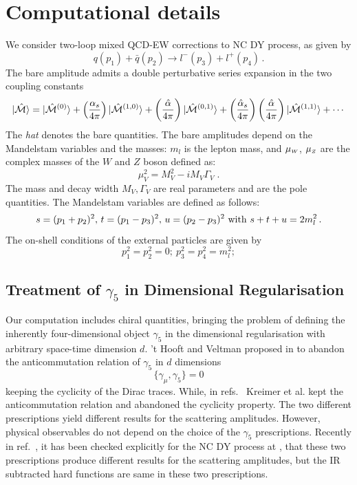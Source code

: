 \documentclass[a4paper]{jpconf}
\begin{document}
\section{Computational details}
\label{sec:comp}
We consider two-loop mixed QCD-EW corrections to NC DY process, as given by
\begin{equation}
 q(p_1) + \bar{q}(p_2) \rightarrow l^{-}(p_3) + l^{+} (p_4) \,.
\label{eq:process}
\end{equation}
% 
The bare amplitude admits a double perturbative series expansion in the two coupling constants
\begin{equation}
 | \unM \rangle = |\unM^{(0)} \rangle + \asr |\unM^{(1,0)} \rangle + \uaem |\unM^{(0,1)} \rangle  + \asrhat \uaem |\unM^{(1,1)} \rangle + \cdots
\end{equation}
% 
The \textit{hat} denotes the bare quantities.
% 
The bare amplitudes depend on the Mandelstam variables and the masses: $m_l$ is the lepton mass, and $\mu_{\scriptscriptstyle W}$, $\mu_{\scriptscriptstyle Z}$ are the complex masses
of the $W$ and $Z$ boson
% 
defined as:
\begin{equation}
\mu_V^2=M_V^2-i M_V\Gamma_V\;.
\end{equation}
The mass and decay width $M_V,\Gamma_V$ are real parameters and are the pole quantities.
The Mandelstam variables are defined as follows:
\begin{equation}
 s = (p_1+p_2)^2, \, t = (p_1-p_3)^2, \, u = (p_2-p_3)^2 \,\, {\rm with} \,\, s+t+u=2 m_l^2 \,.
\end{equation}
The on-shell conditions of the external particles are given by
\begin{equation}
 p_1^2 = p_2^2 = 0; ~ p_3^2 = p_4^2 = m_l^2;
\end{equation}
% 


\subsection{Treatment of $\gamma_5$ in Dimensional Regularisation}
\label{sec:gamma5}


Our computation includes chiral quantities, bringing the problem of defining the inherently four-dimensional object 
$\gamma_5$ in the dimensional regularisation with arbitrary space-time dimension $d$.
% 
't Hooft and Veltman proposed in \cite{'tHooft:1972fi} to abandon the anticommutation relation of $\gamma_5$ in $d$ dimensions
\begin{equation}
 \{\gamma_\mu,\gamma_5\} = 0
\end{equation}
keeping the cyclicity of the Dirac traces.
% 
While, in refs.~\cite{Kreimer:1989ke,Korner:1991sx} Kreimer et al. kept the anticommutation relation
and abandoned the cyclicity property.
% 
The two different prescriptions yield different results for the scattering amplitudes.
However, physical observables do not depend on the choice of the $\gamma_5$ prescriptions.
% 
Recently in ref.~\cite{Heller:2020owb}, it has been checked explicitly for the NC DY process at \oaas,
that these two prescriptions produce different results for the scattering amplitudes,
but the IR subtracted hard functions are same in these two prescriptions.
\end{document}
